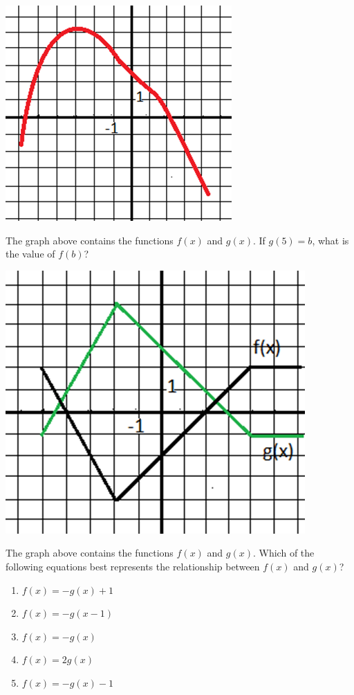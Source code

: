 \begin{multienumerate}
{\includegraphics{51}

The graph above contains the functions $f(x)$ and $g(x)$. If $g(5)=b$, what is the value of $f(b)$?
}{\medium

\includegraphics{52}

The graph above contains the functions $f(x)$ and $g(x)$. Which of the following equations best represents the relationship between $f(x)$ and $g(x)$?

\begin{enumerate}[label=(\Alph*)]
\item $f(x)=-g(x)+1$
\item $f(x)=-g(x-1)$
\item $f(x)=-g(x)$
\item $f(x)=2g(x)$
\item $f(x)=-g(x)-1$
\end{enumerate}}


\end{multienumerate}

